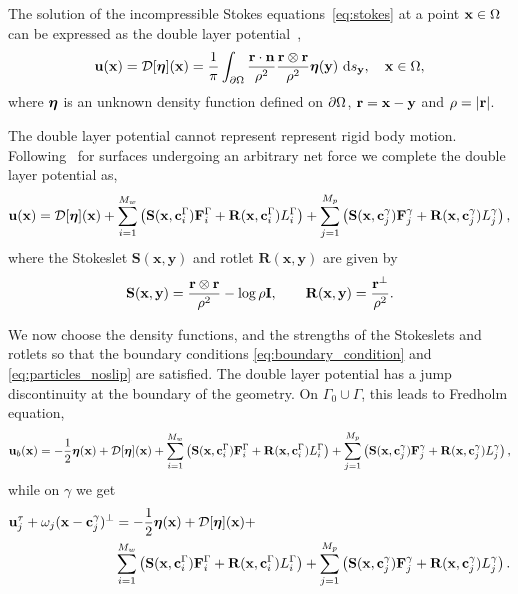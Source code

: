 \documentclass[preprint, 10pt]{elsarticle}
\begin{document}
The solution of the incompressible Stokes
equations~\eqref{eq:stokes} at a point ${\mathbf{x}} \in \Omega$ can be expressed
as the double layer potential~\cite{Ladyzhenskaya1963, Pozrikidis1992},
\begin{align}
  \label{eq:dlp}
  {\mathbf{u}}({\mathbf{x}}) = {\mathcal{D}}[{\boldsymbol\eta}]({\mathbf{x}}) = \frac{1}{\pi}\int_{{\partial}\Omega}
  \frac{{\mathbf{r}}\cdot\mathbf{n}}{\rho^2}\frac{{\mathbf{r}} \otimes {\mathbf{r}}}{\rho^2}
  {\boldsymbol\eta}({\mathbf{y}})~\text{d}s_{{\mathbf{y}}}, \quad {\mathbf{x}} \in \Omega,
\end{align}
where ${\boldsymbol\eta}$ is an unknown density function defined  on ${\partial}\Omega$,
${\mathbf{r}} = {\mathbf{x}} - {\mathbf{y}}$ and $\rho=|{\mathbf{r}}|$. 

The double layer potential cannot represent represent rigid body motion.  Following~\cite{Power1987,
Power1993} for surfaces undergoing an arbitrary net force we complete
the double layer potential as,
\begin{align}
  \label{eq:completed_DLP}
  {\mathbf{u}}({\mathbf{x}}) = {\mathcal{D}}[{\boldsymbol\eta}]({\mathbf{x}}) + 
             \sum_{i=1}^{M_w} \left(\mathbf{S}({\mathbf{x}},{\mathbf{c}}^\Gamma_i){\mathbf{F}}^\Gamma_i + 
                \mathbf{R}({\mathbf{x}},{\mathbf{c}}^\Gamma_i)L^\Gamma_i\right) + \sum_{j=1}^{M_p} \left(\mathbf{S}({\mathbf{x}},{\mathbf{c}}^\gamma_j){\mathbf{F}}^\gamma_j + 
                \mathbf{R}({\mathbf{x}},{\mathbf{c}}^\gamma_j)L^\gamma_j\right)  ,
\end{align}
where the Stokeslet $\mathbf{S}(\mathbf{x},\mathbf{y})$ and rotlet
$\mathbf{R}(\mathbf{x},\mathbf{y})$ are given by
\begin{align*}
  \mathbf{S}({\mathbf{x}},{\mathbf{y}}) = \frac{{\mathbf{r}} \otimes {\mathbf{r}}}{\rho^2} - 
  \log\rho\mathbf{I}, \qquad 
  \mathbf{R}({\mathbf{x}},{\mathbf{y}}) = \frac{{\mathbf{r}}^\perp}{\rho^2}.
\end{align*}

We now choose the density functions, and the strengths of the Stokeslets
and rotlets so that the boundary
conditions \eqref{eq:boundary_condition} and \eqref{eq:particles_noslip} are satisfied.  
The double layer potential has a jump discontinuity at the boundary of
the geometry. On $\Gamma_0\cup\Gamma$, this leads to
Fredholm equation,
\begin{equation}
  \label{eq:vel_walls} 
  \begin{aligned}
 {\mathbf{u}}_b({\mathbf{x}}) = -\frac{1}{2}{\boldsymbol\eta}({\mathbf{x}}) + {\mathcal{D}}[{\boldsymbol\eta}]({\mathbf{x}}) + 
             \sum_{i=1}^{M_w} \left(\mathbf{S}({\mathbf{x}},{\mathbf{c}}^\Gamma_i){\mathbf{F}}^\Gamma_i + 
                \mathbf{R}({\mathbf{x}},{\mathbf{c}}^\Gamma_i)L^\Gamma_i\right) + \sum_{j=1}^{M_p} \left(\mathbf{S}({\mathbf{x}},{\mathbf{c}}^\gamma_j){\mathbf{F}}^\gamma_j + 
                \mathbf{R}({\mathbf{x}},{\mathbf{c}}^\gamma_j)L^\gamma_j\right),  
  \end{aligned}
\end{equation}
while on $\gamma$ we get
\begin{equation}  \label{eq:vel_particles} 
\begin{aligned}
  {\mathbf{u}}^\tau_j + \omega_j({\mathbf{x}}-{\mathbf{c}}^\gamma_j)^\perp &= -\frac{1}{2}{\boldsymbol\eta}({\mathbf{x}}) + {\mathcal{D}}[{\boldsymbol\eta}]({\mathbf{x}}) + \\&
             \sum_{i=1}^{M_w} \left(\mathbf{S}({\mathbf{x}},{\mathbf{c}}^\Gamma_i){\mathbf{F}}^\Gamma_i + 
                \mathbf{R}({\mathbf{x}},{\mathbf{c}}^\Gamma_i)L^\Gamma_i\right) + \sum_{j=1}^{M_p} \left(\mathbf{S}({\mathbf{x}},{\mathbf{c}}^\gamma_j){\mathbf{F}}^\gamma_j + 
                \mathbf{R}({\mathbf{x}},{\mathbf{c}}^\gamma_j)L^\gamma_j\right).
 \end{aligned}
\end{equation}         
\end{document}
